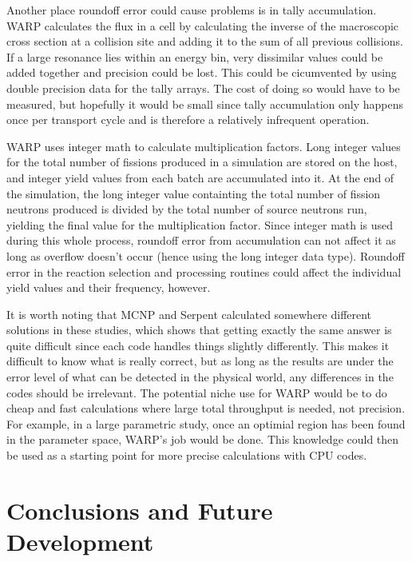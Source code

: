 \documentclass[preprint,12pt]{elsarticle}
\begin{document}
Another place roundoff error could cause problems is in tally accumulation.  WARP calculates the flux in a cell by calculating the inverse of the macroscopic cross section at a collision site and adding it to the sum of all previous collisions.  If a large resonance lies within an energy bin, very dissimilar values could be added together and precision could be lost.  This could be cicumvented by using double precision data for the tally arrays.  The cost of doing so would have to be measured, but hopefully it would be small since tally accumulation only happens once per transport cycle and is therefore a relatively infrequent operation.

WARP uses integer math to calculate multiplication factors.  Long integer values for the total number of fissions produced in a simulation are stored on the host, and integer yield values from each batch are accumulated into it.  At the end of the simulation, the long integer value containting the total number of fission neutrons produced is divided by the total number of source neutrons run, yielding the final value for the multiplication factor. Since integer math is used during this whole process, roundoff error from accumulation can not affect it as long as overflow doesn't occur (hence using the long integer data type).  Roundoff error in the reaction selection and processing routines could affect the individual yield values and their frequency, however.

It is worth noting that MCNP and Serpent calculated somewhere different solutions in these studies, which shows that getting exactly the same answer is quite difficult since each code handles things slightly differently.  This makes it difficult to know what is really correct, but as long as the results are under the error level of what can be detected in the physical world, any differences in the codes should be irrelevant.  The potential niche use for WARP would be to do cheap and fast calculations where large total throughput is needed, not precision.  For example, in a large parametric study, once an optimial region has been found in the parameter space, WARP's job would be done.  This knowledge could then be used as a starting point for more precise calculations with CPU codes.


\section{Conclusions and Future Development}
\label{sec:concdev}
\end{document}
